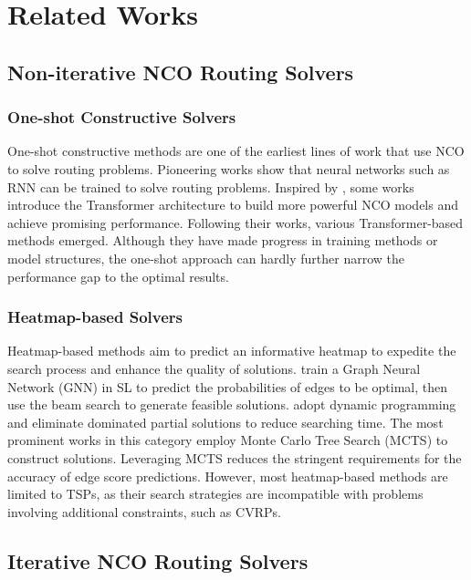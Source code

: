 \section{Related Works}
\subsection{Non-iterative NCO Routing Solvers}

\subsubsection{One-shot Constructive Solvers}
One-shot constructive methods are one of the earliest lines of work that use NCO to solve routing problems. Pioneering works \cite{vinyals2015pointer, bello2016neural, nazari2018reinforcement} show that neural networks such as RNN can be trained to solve routing problems. Inspired by \citet{vaswani2017attention}, some works
\cite{kool2018attention, deudon2018learning} introduce the Transformer architecture to build more powerful NCO models and achieve promising performance. Following their works, various Transformer-based methods \cite{kwon2020pomo, drakulic2023bq, luo2023lehd} emerged. Although they have made progress in training methods or model structures, the one-shot approach can hardly further narrow the performance gap to the optimal results. 

\subsubsection{Heatmap-based Solvers}
Heatmap-based methods aim to predict an informative heatmap to expedite the search process and enhance the quality of solutions. \citet{joshi2019efficient} train a Graph Neural Network (GNN) in SL to predict the probabilities of edges to be optimal, then use the beam search to generate feasible solutions. \citet{kool2022deep} adopt dynamic programming and eliminate dominated partial solutions to reduce searching time. The most prominent works \cite{fu2021generalize, sun2023difusco} in this category employ Monte Carlo Tree Search (MCTS) to construct solutions. Leveraging MCTS reduces the stringent requirements for the accuracy of edge score predictions. However, most heatmap-based methods are limited to TSPs, as their search strategies are incompatible with problems involving additional constraints, such as CVRPs.

\subsection{Iterative NCO Routing Solvers}

